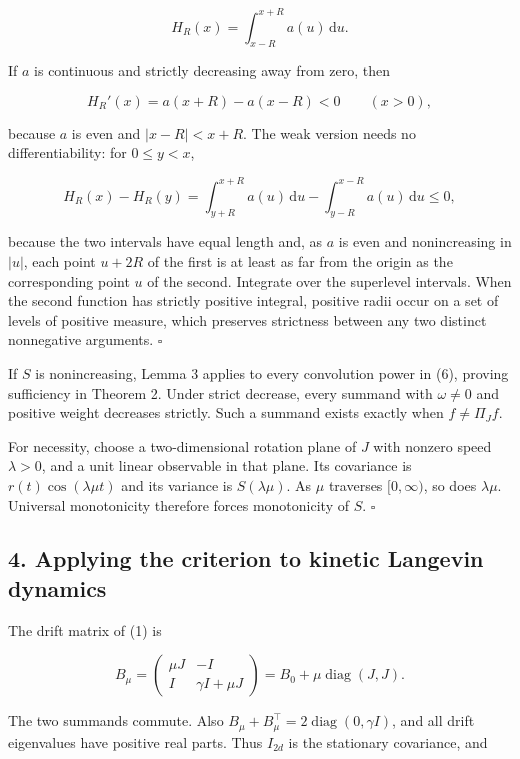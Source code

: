 \documentclass[
  british,
  11pt,
  a4paper,
]{article}
\begin{document}
\[
H_R(x)=\int_{x-R}^{x+R}a(u)\,\mathrm du .
\]

If \(a\) is continuous and strictly decreasing away from zero, then

\[
H_R'(x)=a(x+R)-a(x-R)<0\qquad(x>0),
\]

because \(a\) is even and \(|x-R|<x+R\). The weak version needs no
differentiability: for \(0\le y<x\),

\[
H_R(x)-H_R(y)=\int_{y+R}^{x+R}a(u)\,\mathrm du-\int_{y-R}^{x-R}a(u)\,\mathrm du\le0,
\]

because the two intervals have equal length and, as \(a\) is even and
nonincreasing in \(|u|\), each point \(u+2R\) of the first is at least
as far from the origin as the corresponding point \(u\) of the second.
Integrate over the superlevel intervals. When the second function has
strictly positive integral, positive radii occur on a set of levels of
positive measure, which preserves strictness between any two distinct
nonnegative arguments. \(\square\)

If \(S\) is nonincreasing, Lemma 3 applies to every convolution power in
(6), proving sufficiency in Theorem 2. Under strict decrease, every
summand with \(\omega\ne0\) and positive weight decreases strictly. Such
a summand exists exactly when \(f\ne\Pi_Jf\).

For necessity, choose a two-dimensional rotation plane of \(J\) with
nonzero speed \(\lambda>0\), and a unit linear observable in that plane.
Its covariance is \(r(t)\cos(\lambda\mu t)\) and its variance is
\(S(\lambda\mu)\). As \(\mu\) traverses \([0,\infty)\), so does
\(\lambda\mu\). Universal monotonicity therefore forces monotonicity of
\(S\). \(\square\)

\subsection{4. Applying the criterion to kinetic Langevin
dynamics}\label{applying-the-criterion-to-kinetic-langevin-dynamics}

The drift matrix of (1) is

\[
B_\mu=\begin{pmatrix}\mu J&-I\\I&\gamma I+\mu J\end{pmatrix}
=B_0+\mu\mathop{\mathrm{diag}}(J,J).
\]

The two summands commute. Also
\(B_\mu+B_\mu^\top=2\mathop{\mathrm{diag}}(0,\gamma I)\), and all drift
eigenvalues have positive real parts. Thus \(I_{2d}\) is the stationary
covariance, and
\end{document}
